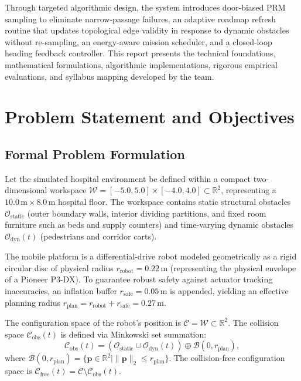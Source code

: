 \documentclass[12pt,a4paper]{article}
\begin{document}
Through targeted algorithmic design, the system introduces door-biased PRM sampling to eliminate narrow-passage failures, an adaptive roadmap refresh routine that updates topological edge validity in response to dynamic obstacles without re-sampling, an energy-aware mission scheduler, and a closed-loop heading feedback controller. This report presents the technical foundations, mathematical formulations, algorithmic implementations, rigorous empirical evaluations, and syllabus mapping developed by the team.

\section{Problem Statement and Objectives}

\subsection{Formal Problem Formulation}
Let the simulated hospital environment be defined within a compact two-dimensional workspace $\mathcal{W} = [-5.0, 5.0] \times [-4.0, 4.0] \subset \mathbb{R}^2$, representing a $10.0\,\text{m} \times 8.0\,\text{m}$ hospital floor. The workspace contains static structural obstacles $\mathcal{O}_{\text{static}}$ (outer boundary walls, interior dividing partitions, and fixed room furniture such as beds and supply counters) and time-varying dynamic obstacles $\mathcal{O}_{\text{dyn}}(t)$ (pedestrians and corridor carts).

The mobile platform is a differential-drive robot modeled geometrically as a rigid circular disc of physical radius $r_{\text{robot}} = 0.22\,\text{m}$ (representing the physical envelope of a Pioneer P3-DX). To guarantee robust safety against actuator tracking inaccuracies, an inflation buffer $r_{\text{safe}} = 0.05\,\text{m}$ is appended, yielding an effective planning radius $r_{\text{plan}} = r_{\text{robot}} + r_{\text{safe}} = 0.27\,\text{m}$.

The configuration space of the robot's position is $\mathcal{C} = \mathcal{W} \subset \mathbb{R}^2$. The collision space $\mathcal{C}_{\text{obs}}(t)$ is defined via Minkowski set summation:
\begin{equation}
\mathcal{C}_{\text{obs}}(t) = \left( \mathcal{O}_{\text{static}} \cup \mathcal{O}_{\text{dyn}}(t) \right) \oplus \mathcal{B}(0, r_{\text{plan}}),
\end{equation}
where $\mathcal{B}(0, r_{\text{plan}}) = \{ \mathbf{p} \in \mathbb{R}^2 \mid \|\mathbf{p}\|_2 \leq r_{\text{plan}} \}$. The collision-free configuration space is $\mathcal{C}_{\text{free}}(t) = \mathcal{C} \setminus \mathcal{C}_{\text{obs}}(t)$.
\end{document}
